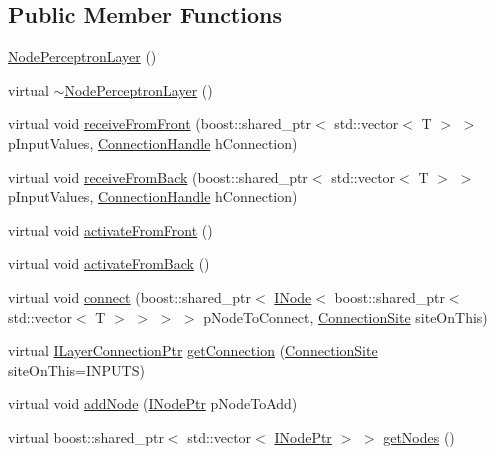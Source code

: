 \subsection*{Public Member Functions}
\begin{DoxyCompactItemize}
\item 
\hyperlink{class_neural_1_1_node_perceptron_layer_a192982bd5b7c3cb4ca74a75ceb4c0ecf}{NodePerceptronLayer} ()
\item 
virtual \hyperlink{class_neural_1_1_node_perceptron_layer_acca84eea36734c4e0fe42e47ec17f26a}{$\sim$NodePerceptronLayer} ()
\item 
virtual void \hyperlink{class_neural_1_1_node_perceptron_layer_a617148ef0ebece3a8de899fb776bb7b0}{receiveFromFront} (boost::shared\_\-ptr$<$ std::vector$<$ T $>$ $>$ pInputValues, \hyperlink{namespace_neural_a73b2763d14999ad4308dbf4246aa503f}{ConnectionHandle} hConnection)
\item 
virtual void \hyperlink{class_neural_1_1_node_perceptron_layer_ac2cad7fc962758f610074b89fde23ca1}{receiveFromBack} (boost::shared\_\-ptr$<$ std::vector$<$ T $>$ $>$ pInputValues, \hyperlink{namespace_neural_a73b2763d14999ad4308dbf4246aa503f}{ConnectionHandle} hConnection)
\item 
virtual void \hyperlink{class_neural_1_1_node_perceptron_layer_aa10fa97cf43ca754f12328601fb2d2f6}{activateFromFront} ()
\item 
virtual void \hyperlink{class_neural_1_1_node_perceptron_layer_ab7d152cd6cb287d145e4a371e1d2d9ca}{activateFromBack} ()
\item 
virtual void \hyperlink{class_neural_1_1_node_perceptron_layer_a5c3ab08bb312b6ed5d4dff45cdc32b53}{connect} (boost::shared\_\-ptr$<$ \hyperlink{class_neural_1_1_i_node}{INode}$<$ boost::shared\_\-ptr$<$ std::vector$<$ T $>$ $>$ $>$ $>$ pNodeToConnect, \hyperlink{namespace_neural_add871cb0324e8abfb693026afba3a621}{ConnectionSite} siteOnThis)
\item 
virtual \hyperlink{class_neural_1_1_node_perceptron_layer_a846a430dabc450603ae134904a083750}{ILayerConnectionPtr} \hyperlink{class_neural_1_1_node_perceptron_layer_ab469e7b054d75cbe72482b838071800b}{getConnection} (\hyperlink{namespace_neural_add871cb0324e8abfb693026afba3a621}{ConnectionSite} siteOnThis=INPUTS)
\item 
virtual void \hyperlink{class_neural_1_1_node_perceptron_layer_a8d367ad2d62b565aca6e807d26c75321}{addNode} (\hyperlink{class_neural_1_1_i_node_layer_a31357b3a61112d5c534c52693ffba054}{INodePtr} pNodeToAdd)
\item 
virtual boost::shared\_\-ptr$<$ std::vector$<$ \hyperlink{class_neural_1_1_i_node_layer_a31357b3a61112d5c534c52693ffba054}{INodePtr} $>$ $>$ \hyperlink{class_neural_1_1_node_perceptron_layer_adb210d898fe61f2e167f228f3d1b2d95}{getNodes} ()
\end{DoxyCompactItemize}
